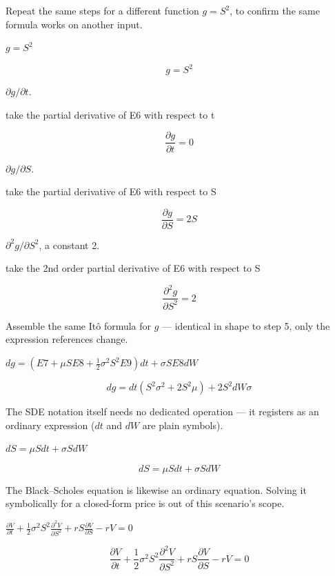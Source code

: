\documentclass[dvipdfmx]{article}
\begin{document}
Repeat the same steps for a different function $g=S^2$, to confirm the same formula works on another input.

$g = S^2$

\begin{equation}
  g = S^2
  \label{eq:E6}
\end{equation}

$\partial g/\partial t$.

take the partial derivative of E6 with respect to t

\begin{equation}
  \frac{\partial g}{\partial t} = 0
  \label{eq:E7}
\end{equation}

$\partial g/\partial S$.

take the partial derivative of E6 with respect to S

\begin{equation}
  \frac{\partial g}{\partial S} = 2 S
  \label{eq:E8}
\end{equation}

$\partial^2 g/\partial S^2$, a constant 2.

take the 2nd order partial derivative of E6 with respect to S

\begin{equation}
  \frac{\partial^{2} g}{\partial S^{2}} = 2
  \label{eq:E9}
\end{equation}

Assemble the same Itô formula for $g$ — identical in shape to step 5, only the expression references change.

$dg = (E7 + \mu S E8 + \frac{1}{2}\sigma^2 S^2 E9) dt + \sigma S E8 dW$

\begin{equation}
  dg=dt \left(S^2 \sigma^2+2 S^2 \mu\right)+2 S^2 dW \sigma
  \label{eq:E10}
\end{equation}

The SDE notation itself needs no dedicated operation — it registers as an ordinary expression ($dt$ and $dW$ are plain symbols).

$dS = \mu S dt + \sigma S dW$

\begin{equation}
  dS = \mu S dt + \sigma S dW
  \label{eq:E11}
\end{equation}

The Black–Scholes equation is likewise an ordinary equation. Solving it symbolically for a closed-form price is out of this scenario's scope.

$\frac{\partial V}{\partial t} + \frac{1}{2}\sigma^2 S^2 \frac{\partial^2 V}{\partial S^2} + r S \frac{\partial V}{\partial S} - r V = 0$

\begin{equation}
  \frac{\partial V}{\partial t} + \frac{1}{2}\sigma^2 S^2 \frac{\partial^2 V}{\partial S^2} + r S \frac{\partial V}{\partial S} - r V = 0
  \label{eq:E12}
\end{equation}
\end{document}
